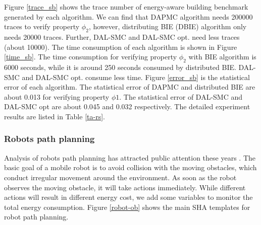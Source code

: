 Figure \ref{trace_sb} shows the trace number of energy-aware building benchmark generated by each algorithm. We can find that DAPMC algorithm needs 200000 traces to verify property $\phi_2$, however, distributing BIE (DBIE) algorithm only needs 20000 traces. Further, DAL-SMC and DAL-SMC opt. need less traces (about 10000). The time consumption of each algorithm is shown in Figure \ref{time_sb}. The time consumption for verifying property $\phi_2$ with BIE algorithm is 6000 seconds, while it is around 250 seconds consumed by distributed BIE. DAL-SMC and DAL-SMC opt. consume less time. Figure \ref{error_sb} is the statistical error of each algorithm. The statistical error of DAPMC and distributed BIE are about 0.013 for verifying property $\phi1$. The statistical error of DAL-SMC and DAL-SMC opt are about 0.045 and 0.032 respectively. The detailed experiment results are listed in Table \ref{ta-rs}. 

\subsubsection{Robots path planning}

Analysis of robots path planning has attracted public attention these years \cite{LWAB10}. The basic goal of a mobile robot is to avoid collision with the moving obstacles, which conduct irregular
movement around the environment. As soon as the robot observes the moving obstacle, it will take actions immediately. While different actions will result in different energy cost, we add some variables to monitor the total energy consumption. Figure \ref{robot-ob} shows the main SHA templates for robot path planning.

\begin{figure}[htbp]
\end{figure}


